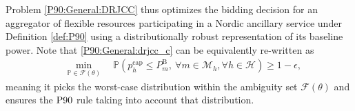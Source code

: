 \documentclass[conference]{IEEEtran}
\begin{document}
Problem \eqref{P90:General:DRJCC} thus optimizes the bidding decision for an aggregator of flexible resources participating in a Nordic ancillary service under Definition \ref{def:P90} using a distributionally robust representation of its baseline power. Note that \eqref{P90:General:drjcc_c} can be equivalently re-written as 
    \begin{align}
    &     \min_{\mathbb{P} \in \mathcal{F}(\theta)} \quad       \mathbb{P}  \left( p_{h}^{\text{cap}} \leq P_{m}^{\text{B}}, \ \forall{m} \in \mathcal{M}_{h},  \forall{h} \in \mathcal{H}  \right) 
         \geq 1 - \epsilon, \label{P90:General:drjcc_c2}
    \end{align}
meaning it picks the worst-case distribution within the ambiguity set $\mathcal{F}(\theta)$ and ensures the $\rm{P90}$ rule taking into account that distribution. 


\vspace{2mm}
\end{document}
